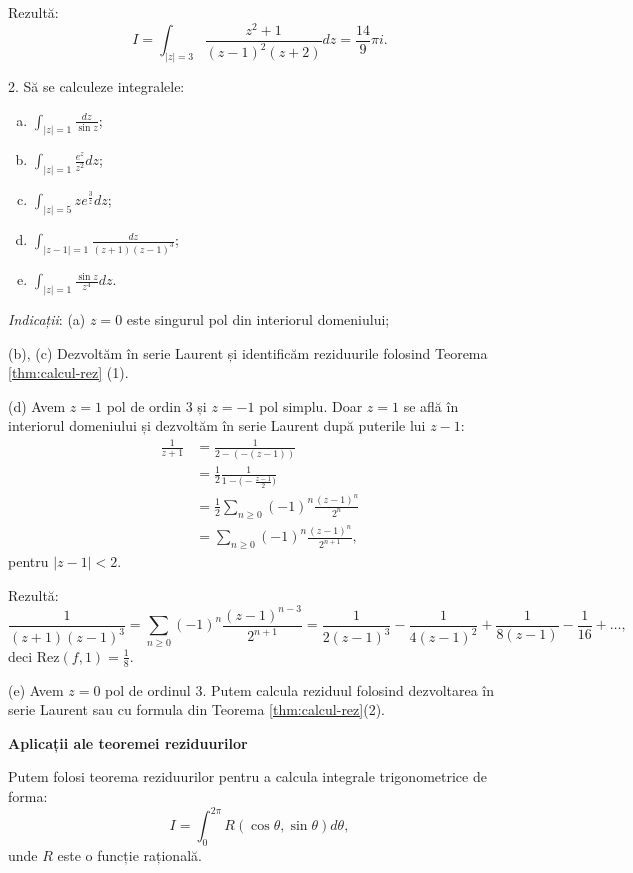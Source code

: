 \documentclass[12pt,a4paper]{article}
\newcommand\ds{\displaystyle}
\newcommand\Rez{\mathrm{Rez}}
\theoremstyle{dotless}
\theoremstyle{dotlessdr}
\begin{document}
Rezultă:
\[
  I = \int_{|z| = 3} \frac{z^2 + 1}{(z - 1)^2(z + 2)} dz = \frac{14}{9} \pi i.
\]

\vspace{1cm}

2. Să se calculeze integralele:
\begin{enumerate}[(a)]
\item $ \ds\int_{|z| = 1} \frac{dz}{\sin z} $;
\item $ \ds\int_{|z| = 1} \frac{e^z}{z^2}dz $;
\item $ \ds\int_{|z| = 5} z e^{\frac{3}{z}} dz $;
\item $ \ds\int_{|z - 1| = 1} \frac{dz}{(z + 1)(z - 1)^3} $;
\item $ \ds\int_{|z| = 1} \frac{\sin z}{z^4} dz $.
\end{enumerate}

\emph{Indicații}: (a) $ z = 0 $ este singurul pol din interiorul domeniului;

(b), (c) Dezvoltăm în serie Laurent și identificăm reziduurile folosind
Teorema \ref{thm:calcul-rez} (1).

(d) Avem $ z = 1 $ pol de ordin 3 și $ z = -1 $ pol simplu. Doar $ z = 1 $ se află
în interiorul domeniului și dezvoltăm în serie Laurent după puterile lui $ z - 1 $:
\begin{align*}
  \frac{1}{z + 1} &= \frac{1}{2 - (-(z - 1))} \\
                  &= \frac{1}{2} \frac{1}{1 - \big(-\frac{z - 1}{2}\big)} \\
                  &= \frac{1}{2} \sum_{n \geq 0} (-1)^n \frac{(z - 1)^n}{2^n} \\
                  &= \sum_{n \geq 0} (-1)^n \frac{(z - 1)^n}{2^{n+1}},
\end{align*}
pentru $ |z - 1| < 2 $.

Rezultă:
\[
  \frac{1}{(z + 1)(z - 1)^3} = \sum_{n \geq 0} (-1)^n \frac{(z - 1)^{n-3}}{2^{n+1}} = %
  \frac{1}{2(z - 1)^3} - \frac{1}{4(z - 1)^2} + \frac{1}{8(z - 1)} - \frac{1}{16} + \dots,
\]
deci $ \Rez(f, 1) = \frac{1}{8} $.

(e) Avem $ z = 0 $ pol de ordinul 3. Putem calcula reziduul folosind dezvoltarea în
serie Laurent sau cu formula din Teorema \ref{thm:calcul-rez}(2).

\vspace{2cm}

\textbf{Aplicații ale teoremei reziduurilor}

Putem folosi teorema reziduurilor pentru a calcula integrale trigonometrice de forma:
\[
  I = \int_0^{2 \pi} R(\cos \theta, \sin \theta) d \theta,
\]
unde $ R $ este o funcție rațională.
\end{document}
